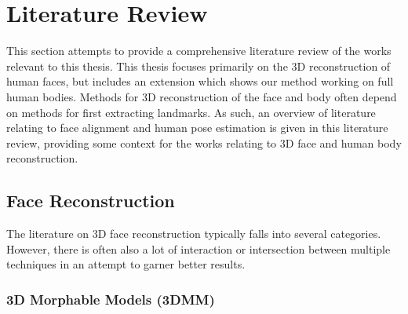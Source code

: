 \chapter{Literature Review}
\label{chapter:literature}

This section attempts to provide a comprehensive literature review of
the works relevant to this thesis. This thesis focuses primarily on
the 3D reconstruction of human faces, but includes an extension which
shows our method working on full human bodies. Methods for 3D
reconstruction of the face and body often depend on methods for first
extracting landmarks. As such, an overview of literature relating to
face alignment and human pose estimation is given in this literature
review, providing some context for the works relating to 3D face and
human body reconstruction.


\section{Face Reconstruction}
\label{chap:literature:sec:face_recon}


The literature on 3D face reconstruction typically falls into several
categories. However, there is often also a lot of interaction or
intersection between multiple techniques in an attempt to garner
better results.

\subsection{3D Morphable Models (3DMM)}

